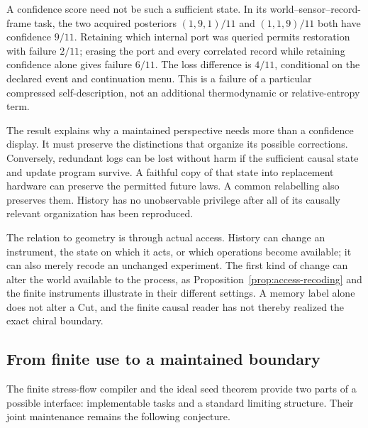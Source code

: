 \documentclass[12pt]{article}
\theoremstyle{definition}
\theoremstyle{remark}
\begin{document}
A confidence score need not be such a sufficient state. In its
world--sensor--record-frame task, the two acquired posteriors
\((1,9,1)/11\) and \((1,1,9)/11\) both have confidence \(9/11\).
Retaining which internal port was queried permits restoration with
failure \(2/11\); erasing the port and every correlated record while
retaining confidence alone gives failure \(6/11\). The loss difference
is \(4/11\), conditional on the declared event and continuation menu.
This is a failure of a particular compressed self-description, not an
additional thermodynamic or relative-entropy term.

The result explains why a maintained perspective needs more than a
confidence display. It must preserve the distinctions that organize its
possible corrections. Conversely, redundant logs can be lost without
harm if the sufficient causal state and update program survive.
A faithful copy of that state into replacement hardware can preserve
the permitted future laws. A common relabelling also preserves them.
History has no unobservable privilege after all of its causally
relevant organization has been reproduced.

The relation to geometry is through actual access. History can change
an instrument, the state on which it acts, or which operations become
available; it can also merely recode an unchanged experiment. The
first kind of change can alter the world available to the process,
as Proposition~\ref{prop:access-recoding} and the finite instruments
illustrate in their different settings. A memory label alone does not
alter a Cut, and the finite causal reader has not thereby realized
the exact chiral boundary.

\subsection{From finite use to a maintained boundary}

The finite stress-flow compiler and the ideal seed theorem provide
two parts of a possible interface: implementable tasks and a standard
limiting structure. Their joint maintenance remains the following
conjecture.
\end{document}
